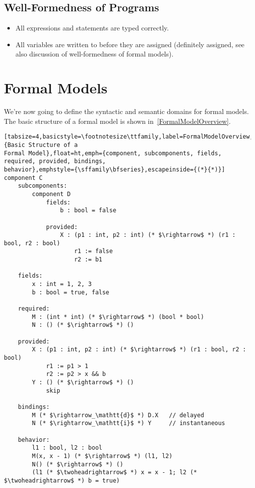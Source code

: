 \documentclass[a4paper,10pt,english]{article}
\begin{document}
\subsection{Well-Formedness of \Fil Programs}
\begin{itemize}
	\item All expressions and statements are typed correctly.
	\item All variables are written to before they are assigned (definitely assigned, see also discussion of well-formedness of
	formal models).
\end{itemize}

\section{Formal Models}
We're now going to define the syntactic and semantic
domains for formal models. The basic structure of a formal model is shown in~\cref{FormalModelOverview}.

\begin{lstlisting}[tabsize=4,basicstyle=\footnotesize\ttfamily,label=FormalModelOverview,caption={Basic Structure of a
Formal Model},float=ht,emph={component, subcomponents, fields, required, provided, bindings,
behavior},emphstyle={\sffamily\bfseries},escapeinside={(*}{*)}]
component C
	subcomponents:
		component D
			fields:
				b : bool = false
				
			provided:
				X : (p1 : int, p2 : int) (* $\rightarrow$ *) (r1 : bool, r2 : bool)
					r1 := false
					r2 := b1

	fields:
		x : int = 1, 2, 3
		b : bool = true, false
		
	required:
		M : (int * int) (* $\rightarrow$ *) (bool * bool)
		N : () (* $\rightarrow$ *) ()
		
	provided:
		X : (p1 : int, p2 : int) (* $\rightarrow$ *) (r1 : bool, r2 : bool)
			r1 := p1 > 1
			r2 := p2 > x && b
		Y : () (* $\rightarrow$ *) ()
			skip
		
	bindings:
		M (* $\rightarrow_\mathtt{d}$ *) D.X   // delayed
		N (* $\rightarrow_\mathtt{i}$ *) Y     // instantaneous
	
	behavior:
		l1 : bool, l2 : bool
		M(x, x - 1) (* $\rightarrow$ *) (l1, l2)
		N() (* $\rightarrow$ *) ()
		(l1 (* $\twoheadrightarrow$ *) x = x - 1; l2 (* $\twoheadrightarrow$ *) b = true)
\end{lstlisting}
\end{document}
